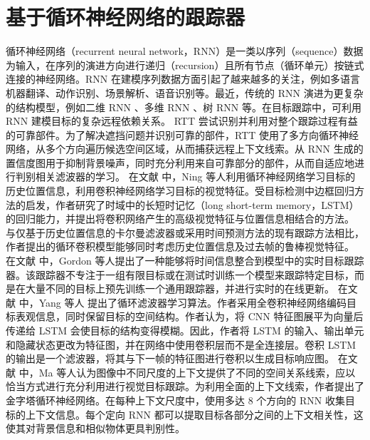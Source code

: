 \section{基于循环神经网络的跟踪器}
循环神经网络（recurrent neural network，RNN）是一类以序列（sequence）数据为输入，在序列的演进方向进行递归（recursion）且所有节点（循环单元）按链式连接的神经网络。RNN 在建模序列数据方面引起了越来越多的关注，例如多语言机器翻译、动作识别、场景解析、语音识别等。最近，传统的 RNN 演进为更复杂的结构模型，例如二维 RNN \cite{shuai2015quaddirectional}、多维 RNN \cite{stollenga2015parallel}、树 RNN \cite{tai2015improved} 等。在目标跟踪中，可利用 RNN 建模目标的复杂远程依赖关系。
RTT \cite{RTT} 尝试识别并利用对整个跟踪过程有益的可靠部件。为了解决遮挡问题并识别可靠的部件，RTT 使用了多方向循环神经网络，从多个方向遍历候选空间区域，从而捕获远程上下文线索。从 RNN 生成的置信度图用于抑制背景噪声，同时充分利用来自可靠部分的部件，从而自适应地进行判别相关滤波器的学习。%
在文献 \cite{SpatiallySupervised} 中，Ning 等人利用循环神经网络学习目标的历史位置信息，利用卷积神经网络学习目标的视觉特征。受目标检测中边框回归方法的启发，作者研究了时域中的长短时记忆（long short-term memory，LSTM）的回归能力，并提出将卷积网络产生的高级视觉特征与位置信息相结合的方法。
与仅基于历史位置信息的卡尔曼滤波器或采用时间预测方法的现有跟踪方法相比，作者提出的循环卷积模型能够同时考虑历史位置信息及过去帧的鲁棒视觉特征。%
在文献 \cite{gordon2018re} 中，Gordon 等人提出了一种能够将时间信息整合到模型中的实时目标跟踪器。该跟踪器不专注于一组有限目标或在测试时训练一个模型来跟踪特定目标，而是在大量不同的目标上预先训练一个通用跟踪器，并进行实时的在线更新。%
在文献 \cite{RecurrentFilter} 中，Yang 等人
提出了循环滤波器学习算法。作者采用全卷积神经网络编码目标表观信息，同时保留目标的空间结构。作者认为，将 CNN 特征图展平为向量后传递给 LSTM 会使目标的结构变得模糊。因此，作者将 LSTM 的输入、输出单元和隐藏状态更改为特征图，并在网络中使用卷积层而不是全连接层。卷积 LSTM 的输出是一个滤波器，将其与下一帧的特征图进行卷积以生成目标响应图。%
在文献 \cite{PRNet} 中，Ma 等人认为图像中不同尺度的上下文提供了不同的空间关系线索，应以恰当方式进行充分利用进行视觉目标跟踪。为利用全面的上下文线索，作者提出了金字塔循环神经网络。在每种上下文尺度中，使用多达 8 个方向的 RNN 收集目标的上下文信息。每个定向 RNN 都可以提取目标各部分之间的上下文相关性，这使其对背景信息和相似物体更具判别性。 %
